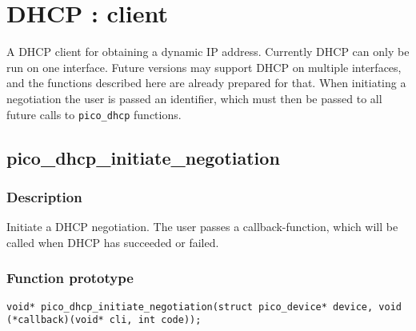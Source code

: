 \section{DHCP : client}

A DHCP client for obtaining a dynamic IP address.
Currently DHCP can only be run on one interface. Future versions may support DHCP on multiple interfaces, and the functions described here are already prepared for that.
When initiating a negotiation the user is passed an identifier, which must then be passed to all future calls to \texttt{pico\_dhcp} functions.


\subsection{pico\_dhcp\_initiate\_negotiation}

\subsubsection*{Description}
Initiate a DHCP negotiation. The user passes a callback-function, which will be called when DHCP has succeeded or failed.

\subsubsection*{Function prototype}
\texttt{void* pico\_dhcp\_initiate\_negotiation(struct pico\_device* device, void (*callback)(void* cli, int code));}

